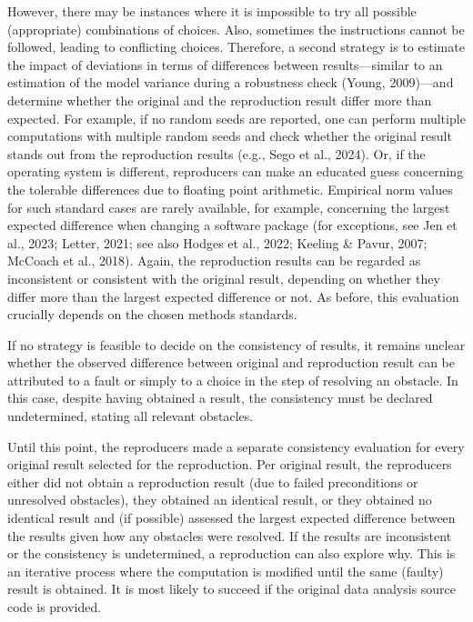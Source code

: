 \documentclass[authordate, meta]{jote-new-article}
\begin{document}
	However, there may be instances where it is impossible to try all possible (appropriate) combinations of choices. Also, sometimes the instructions cannot be followed, leading to conflicting choices. Therefore, a second strategy is to estimate the impact of deviations in terms of differences between results—similar to an estimation of the model variance during a robustness check (Young, 2009)—and determine whether the original and the reproduction result differ more than expected. For example, if no random seeds are reported, one can perform multiple computations with multiple random seeds and check whether the original result stands out from the reproduction results (e.g., Sego et al., 2024). Or, if the operating system is different, reproducers can make an educated guess concerning the tolerable differences due to floating point arithmetic. Empirical norm values for such standard cases are rarely available, for example, concerning the largest expected difference when changing a software package (for exceptions, see Jen et al., 2023; Letter, 2021; see also Hodges et al., 2022; Keeling \& Pavur, 2007; McCoach et al., 2018). Again, the reproduction results can be regarded as inconsistent or consistent with the original result, depending on whether they differ more than the largest expected difference or not. As before, this evaluation crucially depends on the chosen methods standards.



	If no strategy is feasible to decide on the consistency of results, it remains unclear whether the observed difference between original and reproduction result can be attributed to a fault or simply to a choice in the step of resolving an obstacle. In this case, despite having obtained a result, the consistency must be declared undetermined, stating all relevant obstacles.








	Until this point, the reproducers made a separate consistency evaluation for every original result selected for the reproduction. Per original result, the reproducers either did not obtain a reproduction result (due to failed preconditions or unresolved obstacles), they obtained an identical result, or they obtained no identical result and (if possible) assessed the largest expected difference between the results given how any obstacles were resolved. If the results are inconsistent or the consistency is undetermined, a reproduction can also explore why. This is an iterative process where the computation is modified until the same (faulty) result is obtained. It is most likely to succeed if the original data analysis source code is provided.
\end{document}
